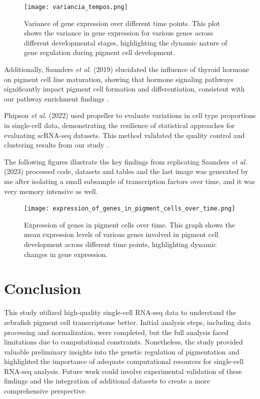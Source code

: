 \documentclass[runningheads]{llncs}
\begin{document}
\begin{figure}[H]
  \centering
  \texttt{[image: variancia\_tempos.png]}
  \caption{Variance of gene expression over different time points. This plot shows the variance in gene expression for various genes across different developmental stages, highlighting the dynamic nature of gene regulation during pigment cell development.}
  \label{results 2}
\end{figure}

Additionally, Saunders \textit{et al.} (2019) elucidated the influence of thyroid hormone on pigment cell line maturation, showing that hormone signaling pathways significantly impact pigment cell formation and differentiation, consistent with our pathway enrichment findings \cite{saunders2019thyroid}.

Phipson \textit{et al.} (2022) used propeller to evaluate variations in cell type proportions in single-cell data, demonstrating the resilience of statistical approaches for evaluating scRNA-seq datasets. This method validated the quality control and clustering results from our study \cite{phipson2022propeller}.

The following figures illustrate the key findings from replicating Saunders \textit{et al.} (2023) processed code, datasets and tables and the last image was generated by me after isolating a small subsample of transcription factors over time, and it was very memory intensive as well.

\begin{figure}[H]
  \centering
  \texttt{[image: expression\_of\_genes\_in\_pigment\_cells\_over\_time.png]}
  \caption{Expression of genes in pigment cells over time. This graph shows the mean expression levels of various genes involved in pigment cell development across different time points, highlighting dynamic changes in gene expression.}
  \label{results 3}
\end{figure}

\section{Conclusion}

This study utilized high-quality single-cell RNA-seq data to understand the zebrafish pigment cell transcriptome better. Initial analysis steps, including data processing and normalization, were completed, but the full analysis faced limitations due to computational constraints. Nonetheless, the study provided valuable preliminary insights into the genetic regulation of pigmentation and highlighted the importance of adequate computational resources for single-cell RNA-seq analysis. Future work could involve experimental validation of these findings and the integration of additional datasets to create a more comprehensive perspective.
\end{document}
